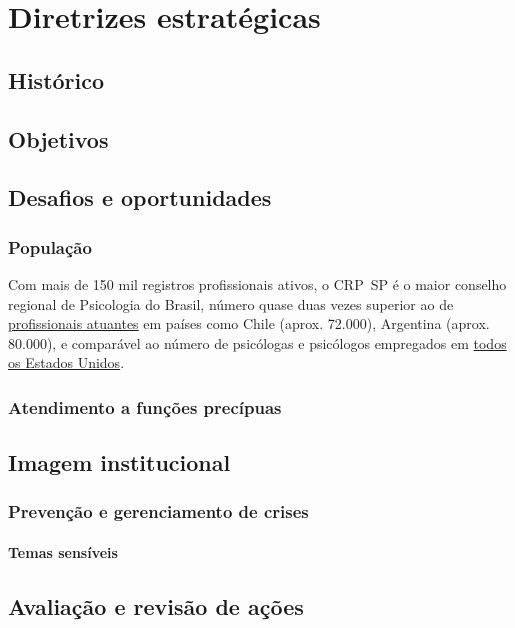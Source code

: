 \chapter{Diretrizes estratégicas}

\section{Histórico}

\section{Objetivos}

\section{Desafios e oportunidades}

\subsection{População}

Com mais de 150 mil registros profissionais ativos, o CRP~SP é o maior conselho regional de Psicologia do Brasil, número quase duas vezes superior ao de \href{https://www.who.int/publications/i/item/9789240036703/}{profissionais atuantes} em países como Chile (aprox. 72.000), Argentina (aprox. 80.000), e comparável ao número de psicólogas e psicólogos  empregados em \href{https://www.bls.gov/ooh/life-physical-and-social-science/psychologists.htm\#tab-7}{todos os Estados Unidos}.

\subsection{Atendimento a funções precípuas}

\section{Imagem institucional}

\subsection{Prevenção e gerenciamento de crises}

\subsubsection{Temas sensíveis}

\section{Avaliação e revisão de ações}